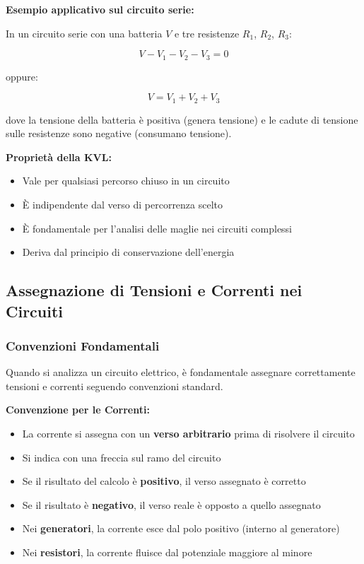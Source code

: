 \documentclass[a4paper,12pt]{article}
\begin{document}
\textbf{Esempio applicativo sul circuito serie:}

In un circuito serie con una batteria $V$ e tre resistenze $R_1$, $R_2$, $R_3$:

\begin{equation}
V - V_1 - V_2 - V_3 = 0
\end{equation}

oppure:

\begin{equation}
V = V_1 + V_2 + V_3
\end{equation}

dove la tensione della batteria è positiva (genera tensione) e le cadute di tensione sulle resistenze sono negative (consumano tensione).

\textbf{Proprietà della KVL:}
\begin{itemize}
    \item Vale per qualsiasi percorso chiuso in un circuito
    \item È indipendente dal verso di percorrenza scelto
    \item È fondamentale per l'analisi delle maglie nei circuiti complessi
    \item Deriva dal principio di conservazione dell'energia
\end{itemize}

\subsection{Assegnazione di Tensioni e Correnti nei Circuiti}

\subsubsection{Convenzioni Fondamentali}

Quando si analizza un circuito elettrico, è fondamentale assegnare correttamente tensioni e correnti seguendo convenzioni standard.

\textbf{Convenzione per le Correnti:}

\begin{itemize}
    \item La corrente si assegna con un \textbf{verso arbitrario} prima di risolvere il circuito
    \item Si indica con una freccia sul ramo del circuito
    \item Se il risultato del calcolo è \textbf{positivo}, il verso assegnato è corretto
    \item Se il risultato è \textbf{negativo}, il verso reale è opposto a quello assegnato
    \item Nei \textbf{generatori}, la corrente esce dal polo positivo (interno al generatore)
    \item Nei \textbf{resistori}, la corrente fluisce dal potenziale maggiore al minore
\end{itemize}
\end{document}
